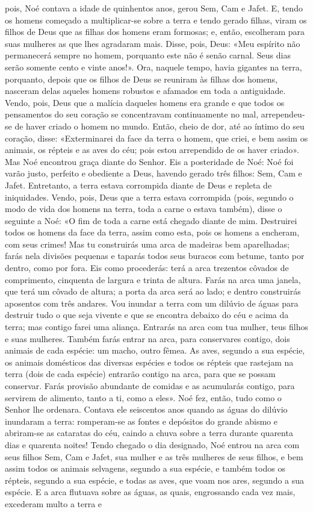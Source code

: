 \begin{paracol}{2}
{ pois, Noé contava a idade de quinhentos anos, gerou Sem, Cam e Jafet. E, tendo os homens começado a multiplicar-se sobre a terra e tendo gerado filhas, viram os filhos de Deus que as filhas dos homens eram formosas; e, então, escolheram para suas mulheres as que lhes agradaram mais. Disse, pois, Deus: «Meu espírito não permanecerá sempre no homem, porquanto este não é senão carnal. Seus dias serão somente cento e vinte anos!». Ora, naquele tempo, havia gigantes na terra, porquanto, depois que os filhos de Deus se reuniram às filhas dos homens, nasceram delas aqueles homens robustos e afamados em toda a antiguidade. Vendo, pois, Deus que a malícia daqueles homens era grande e que todos os pensamentos do seu coração se concentravam continuamente no mal, arrependeu-se de haver criado o homem no mundo. Então, cheio de dor, até ao íntimo do seu coração, disse: «Exterminarei da face da terra o homem, que criei, e bem assim os animais, os répteis e as aves do céu; pois estou arrependido de os haver criado». Mas Noé encontrou graça diante do Senhor. Eis a posteridade de Noé: Noé foi varão justo, perfeito e obediente a Deus, havendo gerado três filhos: Sem, Cam e Jafet. Entretanto, a terra estava corrompida diante de Deus e repleta de iniquidades. Vendo, pois, Deus que a terra estava corrompida (pois, segundo o modo de vida dos homens na terra, toda a carne o estava também), disse o seguinte a Noé: «O fim de toda a carne está chegado diante de mim. Destruirei todos os homens da face da terra, assim como esta, pois os homens a encheram, com seus crimes! Mas tu construirás uma arca de madeiras bem aparelhadas; farás nela divisões pequenas e taparás todos seus buracos com betume, tanto por dentro, como por fora. Eis como procederás: terá a arca trezentos côvados de comprimento, cinquenta de largura e trinta de altura. Farás na arca uma janela, que terá um côvado de altura; a porta da arca será ao lado; e dentro construirás aposentos com três andares. Vou inundar a terra com um dilúvio de águas para destruir tudo o que seja vivente e que se encontra debaixo do céu e acima da terra; mas contigo farei uma aliança. Entrarás na arca com tua mulher, teus filhos e suas mulheres. Também farás entrar na arca, para conservares contigo, dois animais de cada espécie: um macho, outro fêmea. As aves, segundo a sua espécie, os animais domésticos das diversas espécies e todos os répteis que rastejam na terra (dois de cada espécie) entrarão contigo na arca, para que se possam conservar. Farás provisão abundante de comidas e as acumularás contigo, para servirem de alimento, tanto a ti, como a eles». Noé fez, então, tudo como o Senhor lhe ordenara. Contava ele seiscentos anos quando as águas do dilúvio inundaram a terra: romperam-se as fontes e depósitos do grande abismo e abriram-se as cataratas do céu, caindo a chuva sobre a terra durante quarenta dias e quarenta noites! Tendo chegado o dia designado, Noé entrou na arca com seus filhos Sem, Cam e Jafet, sua mulher e as três mulheres de seus filhos, e bem assim todos os animais selvagens, segundo a sua espécie, e também todos os répteis, segundo a sua espécie, e todas as aves, que voam nos ares, segundo a sua espécie. E a arca flutuava sobre as águas, as quais, engrossando cada vez mais, excederam multo a terra e }
\end{paracol}

